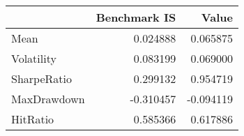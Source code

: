 \begin{tabular}{lrr}
\toprule
{} &  Benchmark IS &     Value \\
\midrule
Mean        &      0.024888 &  0.065875 \\
Volatility  &      0.083199 &  0.069000 \\
SharpeRatio &      0.299132 &  0.954719 \\
MaxDrawdown &     -0.310457 & -0.094119 \\
HitRatio    &      0.585366 &  0.617886 \\
\bottomrule
\end{tabular}
